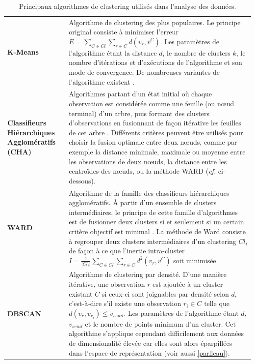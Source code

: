 \begin{longtable}{ @{\hspace{-2cm}} >{\bfseries}p{}@{\hspace{1cm}}|>{\small}p{\textwidth}}
      \caption[Algorithmes de clustering utilisés]{Principaux algorithmes de clustering utilisés dans l'analyse des données.}\\ \label{tabalgoclust}
      K-Means & \citep{hartigan1975clustering,hartigan1979algorithm} Algorithme de clustering des plus populaires. Le principe original consiste à minimiser l'erreur $E=\sum_{C \in Cl}\sum_{r \in C} d(v_{r},\bar{v}^{C})$. Les paramètres de l'algorithme étant la distance $d$, le nombre de clusters $k$, le nombre d'itérations et d'exécutions de l'algorithme et son mode de convergence. De nombreuses variantes de l'algorithme existent \citep{gan2007data}.
	\\[0.4cm]
     Classifieurs \mbox{Hiérarchiques} \mbox{Agglomératifs} (CHA)
      & Algorithmes partant d'un état initial où chaque observation est considérée comme une feuille (ou nœud terminal) d'un arbre, puis formant des clusters d'observations en fusionnant de façon itérative les feuilles de cet arbre \citep{gan2007data}. Différents critères peuvent être utilisés pour choisir la fusion optimale entre deux nœuds, comme par exemple la distance minimale, maximale ou moyenne entre les observations de deux nœuds, la distance entre les centroïdes des nœuds, ou la méthode WARD (\textit{cf.} ci-dessous). 
	\\[0.4cm]
     WARD & \citep{ward1963hierarchical,ward1963application} Algorithme de la famille des classifieurs hiérarchiques agglomératifs. À partir d'un ensemble de clusters intermédiaires, le principe de cette famille d'algorithmes est de fusionner deux clusters si et seulement si un certain critère objectif est minimal \citep{gan2007data}. La méthode de Ward consiste à regrouper deux clusters intermédiaires d'un clustering $Cl_{i}$ de façon à ce que l'inertie intra-cluster $I=\frac{1}{|Cl_{i}|}\sum_{C \in Cl}\sum_{r \in C}d^{2}(v_{r},\bar{v}^{C}) $ soit minimisée.
	\\[0.4cm]
     DBSCAN & \citep{ester1996density} Algorithme de clustering par densité. D'une manière itérative, une observation $r$ est ajoutée à un cluster existant $C$ si ceux-ci sont joignables par densité selon $d$, c'est-à-dire s'il existe une observation $r_{i} \in C$ telle que $d(v_{r},v_{r_{i}})\leqslant v_{seuil}$. Les paramètres de l'algorithme étant $d$, $v_{seuil}$ et le nombre de points minimum d'un cluster. Cet algorithme s'applique cependant difficilement aux données de dimensionalité élevée car elles sont alors éparpillées dans l'espace de représentation \citep{gan2007data} (voir aussi \ref{parfleau}).

\end{longtable}
